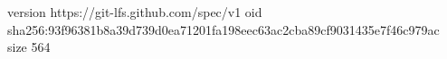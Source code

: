 version https://git-lfs.github.com/spec/v1
oid sha256:93f96381b8a39d739d0ea71201fa198eec63ac2cba89cf9031435e7f46c979ac
size 564
